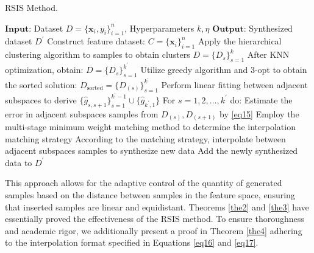 \documentclass[lettersize,journal]{IEEEtran}
\begin{document}
\begin{algorithm}[!b]
  \caption{RSIS Method.}\label{alg:alg3}
  \begin{algorithmic}
  \STATE 
  \STATE $\mathbf{Input}$: Dataset $D=\{\boldsymbol{x}_i,y_i \}_{i=1}^n$,
  Hyperparameters $k,\eta$
  \STATE $\mathbf{Output}$: Synthesized dataset $D^\prime$
  \vspace{5pt} %
  \STATE Construct feature dataset: $C=\{\boldsymbol{x}_i\}_{i=1}^n$
  \STATE Apply the hierarchical clustering algorithm to samples to obtain clusters $D=\{D_s\}_{s=1}^{k}$
  \STATE After KNN optimization, obtain: $D=\{D_s\}_{s=1}^{k^\prime}$
  \STATE Utilize greedy algorithm and 3-opt to obtain the sorted solution: $D_{\text{sorted}}=\{D_{(s)}\}_{s=1}^{k^\prime}$
  \STATE Perform linear fitting between adjacent subspaces to derive $\{\hat{g}_{s,s+1}\}_{s=1}^{k^\prime-1}\cup\{\hat{g}_{k^\prime,1}\}$
  \STATE For $s=1,2,\ldots,k^\prime$ do:
  \STATE \hspace{0.5cm}Estimate the error in adjacent subspaces samples 
  \STATE \hspace{0.5cm}from $D_{(s)},D_{(s+1)}$ by \eqref{eq15}
  \STATE \hspace{0.5cm}Employ the multi-stage minimum weight matching 
  \STATE \hspace{0.5cm}method to determine the interpolation matching 
  \STATE \hspace{0.5cm}strategy
  \STATE \hspace{0.5cm}According to the matching strategy, interpolate 
  \STATE \hspace{0.5cm}between adjacent subspaces samples to synthesize 
  \STATE \hspace{0.5cm}new data
  \STATE \hspace{0.5cm}Add the newly synthesized data to $D^\prime$
  \end{algorithmic}
  \label{Alg3}
\end{algorithm}

This approach allows for the adaptive control of the quantity of 
generated samples based on the distance between samples in the 
feature space, ensuring that inserted samples are linear and 
equidistant. Theorems \ref{the2} and \ref{the3} 
have essentially proved the effectiveness of the RSIS method. 
To ensure thoroughness and academic rigor, we additionally 
present a proof in Theorem \ref{the4} adhering to the interpolation 
format specified in Equations \eqref{eq16} and \eqref{eq17}.
\end{document}
